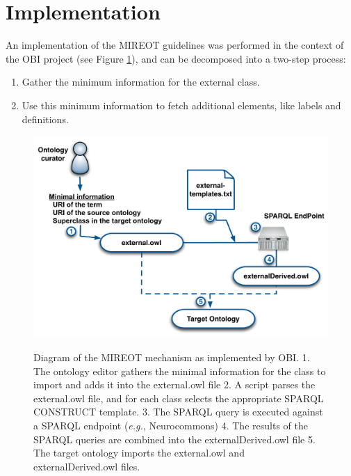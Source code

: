 \documentclass[jou]{ao2e}%
\begin{document}
\section{Implementation}

An implementation of the \ac{MIREOT} guidelines was performed in the context of the \ac{OBI} project (see Figure \ref{fig:mechanism2}), and can be decomposed into a two-step process:

\begin{enumerate}
\item Gather the minimum information for the external class.
\item Use this minimum information to fetch additional elements, like labels and definitions.
\end{enumerate}

\begin{figure}[t]
\centering
{
\includegraphics[width=.9\linewidth]{./figs/mechanism2.pdf}
}
\caption{Diagram of the MIREOT mechanism as implemented by OBI.
1. The ontology editor gathers the minimal information for the class to import and adds it into the external.owl file
2. A script parses the external.owl file, and for each class selects the appropriate SPARQL CONSTRUCT template.
3. The SPARQL query is executed against a SPARQL endpoint (\emph{e.g.}, Neurocommons)
4. The results of the SPARQL queries are combined into the externalDerived.owl file
5. The target ontology imports the external.owl and externalDerived.owl files.
}
\label{fig:mechanism2}
\end{figure}
\end{document}
